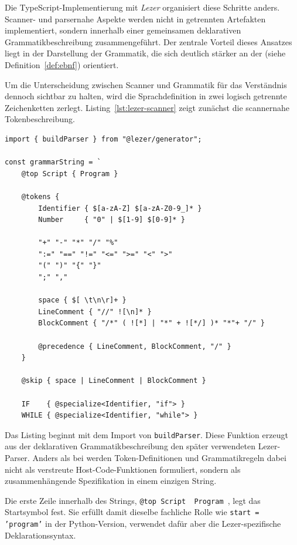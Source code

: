 Die TypeScript-Implementierung mit \emph{Lezer} organisiert diese Schritte anders. Scanner- und parsernahe Aspekte werden nicht in getrennten Artefakten implementiert, sondern innerhalb einer gemeinsamen deklarativen Grammatikbeschreibung zusammengeführt. Der zentrale Vorteil dieses Ansatzes liegt in der Darstellung der Grammatik, die sich deutlich stärker an der  (siehe Definition~\ref{def:ebnf}) orientiert. 

Um die Unterscheidung zwischen Scanner und Grammatik für das Verständnis dennoch sichtbar zu halten, wird die Sprachdefinition in zwei logisch getrennte Zeichenketten zerlegt. Listing~\ref{lst:lezer-scanner} zeigt zunächst die scannernahe Tokenbeschreibung.

\begin{listing}[htbp]
\caption{Beginn der Lezer-Grammatik (Startsymbol und Scanner-Token)}
\label{lst:lezer-scanner}
\begin{verbatim}
import { buildParser } from "@lezer/generator";

const grammarString = `
    @top Script { Program }

    @tokens {
        Identifier { $[a-zA-Z] $[a-zA-Z0-9_]* }
        Number     { "0" | $[1-9] $[0-9]* }

        "+" "-" "*" "/" "%"
        ":=" "==" "!=" "<=" ">=" "<" ">"
        "(" ")" "{" "}"
        ";" ","

        space { $[ \t\n\r]+ }
        LineComment { "//" ![\n]* }
        BlockComment { "/*" ( ![*] | "*" + ![*/] )* "*"+ "/" }

        @precedence { LineComment, BlockComment, "/" }
    }

    @skip { space | LineComment | BlockComment }

    IF    { @specialize<Identifier, "if"> }
    WHILE { @specialize<Identifier, "while"> }
\end{verbatim}
\end{listing}

Das Listing beginnt mit dem Import von \texttt{buildParser}. Diese Funktion erzeugt aus der deklarativen Grammatikbeschreibung den später verwendeten Lezer-Parser. Anders als bei \emph{} werden Token-Definitionen und Grammatikregeln dabei nicht als verstreute Host-Code-Funktionen formuliert, sondern als zusammenhängende Spezifikation in einem einzigen String.

Die erste Zeile innerhalb des Strings, \texttt{@top Script { Program }}, legt das Startsymbol fest. Sie erfüllt damit dieselbe fachliche Rolle wie \texttt{start = 'program'} in der Python-Version, verwendet dafür aber die Lezer-spezifische Deklarationssyntax.

